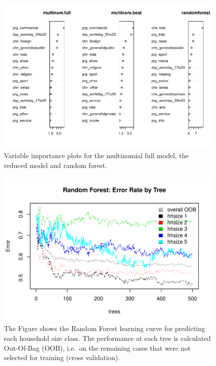 \documentclass[]{article}
\begin{document}
\begin{figure}
\centering
\includegraphics{Diploma_files/figure-latex/unnamed-chunk-29-1.pdf}
\caption{\label{fig:fig9} Variable importance plots for the multinomial
full model, the reduced model and random forest.}
\end{figure}

\pagebreak

\begin{figure}
\centering
\includegraphics{Diploma_files/figure-latex/unnamed-chunk-30-1.pdf}
\caption{\label{fig:fig10} The Figure shows the Random Forest learning
curve for predicting each household size class. The performance at each
tree is calculated Out-Of-Bag (OOB), i.e.~on the remaining cases that
were not selected for training (cross validation).}
\end{figure}
\end{document}
